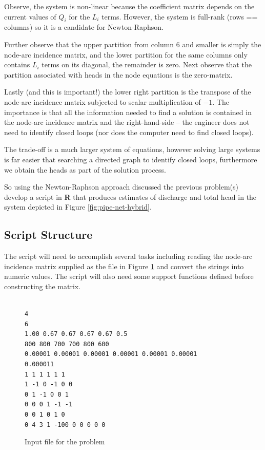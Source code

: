 Observe, the system is non-linear because the coefficient matrix depends on the current values of $Q_i$ for the $L_i$ terms. 
However, the system is full-rank (rows == columns) so it is a candidate for Newton-Raphson.

Further observe that the upper partition from column 6 and smaller is simply the node-arc incidence matrix, and the lower partition for the same columns only contains $L_i$ terms on its diagonal, the remainder is zero.   
Next observe that the partition associated with heads in the node equations is the zero-matrix.

Lastly (and this is important!) the lower right partition is the transpose of the node-arc incidence matrix subjected to scalar multiplication of $-1$.
The importance is that all the information needed to find a solution is contained in the node-arc incidence matrix and the right-hand-side -- the engineer does not need to identify closed loops (nor does the computer need to find closed loops). 

The trade-off is a much larger system of equations, however solving large systems is far easier that searching a directed graph to identify closed loops, furthermore we obtain the heads as part of the solution process.

So using the Newton-Raphson approach discussed the previous problem(s) develop a script in \textbf{R} that produces estimates of discharge and total head in the system depicted in Figure \ref{fig:pipe-net-hybrid}.

\subsection{Script Structure}
The script will need to accomplish several tasks including reading the node-arc incidence matrix supplied as the file in Figure \ref{fig:inputFile} and convert the strings into numeric values.  The script will also need some support functions defined before constructing the matrix.

\begin{figure}[h!] %
   \centering
\begin{verbatim}

4
6
1.00 0.67 0.67 0.67 0.67 0.5
800 800 700 700 800 600
0.00001 0.00001 0.00001 0.00001 0.00001 0.00001
0.000011
1 1 1 1 1 1
1 -1 0 -1 0 0
0 1 -1 0 0 1
0 0 0 1 -1 -1
0 0 1 0 1 0
0 4 3 1 -100 0 0 0 0 0 

\end{verbatim}
   \caption{Input file for the problem}
   \label{fig:inputFile}
\end{figure}

